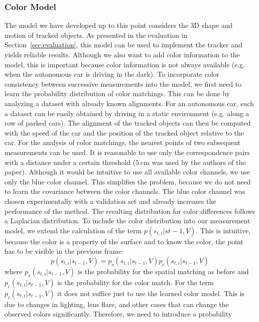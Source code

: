 \documentclass[twoside,a4paper,article]{combine}
\begin{document}
\subsubsection{Color Model}
The model we have developed up to this point considers the 3D shape
and motion of tracked objects. As presented in the evaluation in
Section~\ref{sec:evaluation}, this model can be used to implement the
tracker and yields reliable results. Although we also want to add
color information to the model, this is important because color
information is not always available (e.g. when the autonomous car is
driving in the dark). To incorporate color consistency between successive
measurements into the model,
we first need to learn the probability distribution of color
matchings. This can be done by analyzing a dataset with already known
alignments. For an autonomous car, such a dataset can be easily
obtained by driving in a static environment (e.g. along a row of
parked cars). The alignment of the tracked objects can then be
computed with the speed of the car and the position of the tracked
object relative to the car. For the analysis of color matchings,
the nearest points of two subsequent measurements can be used. It is
reasonable to use only the correspondence pairs with a distance under
a certain threshold ($5~\mathrm{cm}$ was used by the authors of the
paper). Although it would be intuitive to use all available color
channels, we use only the blue color channel. This simplifies the
problem, because we do not need to learn the covariance between the
color channels. The blue color channel was chosen experimentally with a
validation set and already increases the performance of the
method. The resulting distribution for color differences
follows a Laplacian distribution.
To include the color distribution into our measurement model, we
extend the calculation of the term $p(s_{t,i}|s{t-1},V)$. This is
intuitive, because the color is a property of the surface and to know
the color, the point has to be visible in the previous frame:
\begin{equation}
  p(s_{t,i}|s_{t-1},V) = p_s(s_{t,i}|s_{t-1},V) p_c(s_{t,i}|s_{t-1},V)
\end{equation}
where $p_s(s_{t,i}|s_{t-1},V)$ is the probability for the spatial
matching as before and $p_c(s_{t,i}|s_{t-1},V)$ is the probability for
the color match. For the term $p_c(s_{t,i}|s_{t-1},V)$ it does not
suffice just to use the learned color model. This is due to changes in
lighting, lens flare, and other cases that can change the observed
colors significantly. Therefore, we need to introduce a probability
\end{document}

